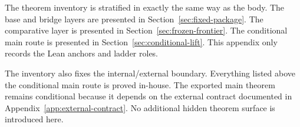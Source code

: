 The theorem inventory is stratified in exactly the same way as the body. The base and bridge layers are presented in Section~\ref{sec:fixed-package}. The comparative layer is presented in Section~\ref{sec:frozen-frontier}. The conditional main route is presented in Section~\ref{sec:conditional-lift}. This appendix only records the Lean anchors and ladder roles.

The inventory also fixes the internal/external boundary. Everything listed above the conditional main route is proved in-house. The exported main theorem remains conditional because it depends on the external contract documented in Appendix~\ref{app:external-contract}. No additional hidden theorem surface is introduced here.
